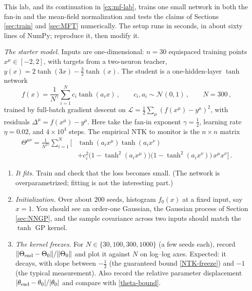 \documentclass[11pt]{article}
\newcommand{\CN}{{\mathcal N}}
\newcommand{\CL}{{\mathcal L}}
\begin{document}
\begin{exercise}
\label{ex:ntk-lab}
\important
This lab, and its continuation in \cref{ex:mf-lab}, trains one small network in both the fan-in and the mean-field normalization and tests the claims of Sections \ref{sec:train} and \ref{sec:MFT} numerically. The setup runs in seconds, in about sixty lines of NumPy; reproduce it, then modify it.

\emph{The starter model.} Inputs are one-dimensional: $n=30$ equispaced training points $x^\mu\in[-2,2]$, with targets from a two-neuron teacher, $y(x) = 2\tanh(3x) - \frac{3}{2}\tanh(x)$. The student is a one-hidden-layer $\tanh$ network
%
\begin{equation} \label{lab-student}
    f(x) = \frac{1}{N^\gamma}\sum_{i=1}^N c_i\tanh(a_ix)\,,\qquad c_i,a_i\sim\CN(0,1)\,,\qquad N=300\,,
\end{equation}
%
trained by full-batch gradient descent on $\CL = \frac{1}{2}\sum_\mu(f(x^\mu)-y^\mu)^2$, with residuals $\Delta^\mu = f(x^\mu)-y^\mu$. Here take the fan-in exponent $\gamma = \frac{1}{2}$, learning rate $\eta = 0.02$, and $4\times10^4$ steps. The empirical NTK to monitor is the $n\times n$ matrix
%
\begin{equation} \label{lab-ntk}
    \begin{aligned}
    \Theta^{\mu\nu} = \frac{1}{N^{2\gamma}}\sum_{i=1}^N\Big[&\tanh(a_ix^\mu)\tanh(a_ix^\nu) \\ &+ c_i^2\big(1-\tanh^2(a_ix^\mu)\big)\big(1-\tanh^2(a_ix^\nu)\big)\,x^\mu x^\nu\Big]\,.
    \end{aligned}
\end{equation}
\begin{enumerate}
    \item \emph{It fits.} Train and check that the loss becomes small. (The network is overparametrized; fitting is not the interesting part.)
    \item \emph{Initialization.} Over about $200$ seeds, histogram $f_0(x)$ at a fixed input, say $x=1$. You should see an order-one Gaussian, the Gaussian process of Section \ref{sec:NNGP}, and the sample covariance across two inputs should match the $\tanh$ GP kernel.
    \item \emph{The kernel freezes.} For $N\in\{30,100,300,1000\}$ (a few seeds each), record $\|\Theta_{\rm end}-\Theta_0\|/\|\Theta_0\|$ and plot it against $N$ on log--log axes. Expected: it decays, with slope between $-\frac{1}{2}$ (the guaranteed bound \eqref{NTK-freeze}) and $-1$ (the typical measurement). Also record the relative parameter displacement $|\theta_{\rm end}-\theta_0|/|\theta_0|$ and compare with \eqref{theta-bound}.

\end{enumerate}
\end{exercise}
\end{document}
